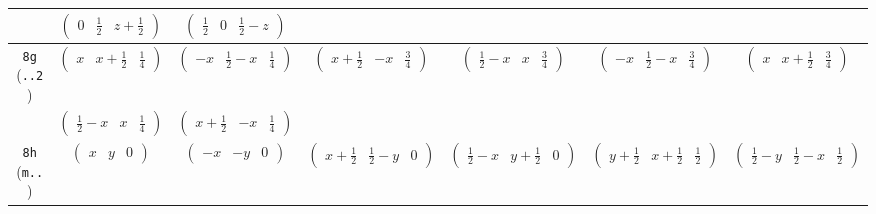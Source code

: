 \documentclass[fleqn,9pt,landscape]{jsarticle}
\begin{document}
\begin{center}
\begin{longtable}{ccccccc}
& $ \begin{pmatrix} 0 & \frac{1}{2} & z + \frac{1}{2} \end{pmatrix} $ & $ \begin{pmatrix} \frac{1}{2} & 0 & \frac{1}{2} - z \end{pmatrix} $ & $  $ & $  $ & $  $ & $  $ \\ \hline
{\tt 8g} ({\tt ..2}) & $ \begin{pmatrix} x & x + \frac{1}{2} & \frac{1}{4} \end{pmatrix} $ & $ \begin{pmatrix} - x & \frac{1}{2} - x & \frac{1}{4} \end{pmatrix} $ & $ \begin{pmatrix} x + \frac{1}{2} & - x & \frac{3}{4} \end{pmatrix} $ & $ \begin{pmatrix} \frac{1}{2} - x & x & \frac{3}{4} \end{pmatrix} $ & $ \begin{pmatrix} - x & \frac{1}{2} - x & \frac{3}{4} \end{pmatrix} $ & $ \begin{pmatrix} x & x + \frac{1}{2} & \frac{3}{4} \end{pmatrix} $ \\
& $ \begin{pmatrix} \frac{1}{2} - x & x & \frac{1}{4} \end{pmatrix} $ & $ \begin{pmatrix} x + \frac{1}{2} & - x & \frac{1}{4} \end{pmatrix} $ & $  $ & $  $ & $  $ & $  $ \\ \hline
{\tt 8h} ({\tt m..}) & $ \begin{pmatrix} x & y & 0 \end{pmatrix} $ & $ \begin{pmatrix} - x & - y & 0 \end{pmatrix} $ & $ \begin{pmatrix} x + \frac{1}{2} & \frac{1}{2} - y & 0 \end{pmatrix} $ & $ \begin{pmatrix} \frac{1}{2} - x & y + \frac{1}{2} & 0 \end{pmatrix} $ & $ \begin{pmatrix} y + \frac{1}{2} & x + \frac{1}{2} & \frac{1}{2} \end{pmatrix} $ & $ \begin{pmatrix} \frac{1}{2} - y & \frac{1}{2} - x & \frac{1}{2} \end{pmatrix} $ \\

\end{longtable}
\end{center}
\end{document}
